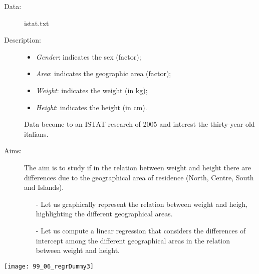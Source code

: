 \begin{frame}
  \begin{description}
    \item[Data: ]istat.txt \\ 
    \item[Description: ]
      \begin{footnotesize}
        \begin{itemize}
          \item \textit{Gender}: indicates the sex (factor);
          \item \textit{Area}: indicates the geographic area (factor);
          \item \textit{Weight}: indicates the weight (in kg);
          \item \textit{Height}: indicates the height (in cm).
        \end{itemize}
      \end{footnotesize}
      \begin{tiny}
       Data become to an ISTAT research of 2005 and interest the thirty-year-old italians.
      \end{tiny}
    \item[Aims: ]
      \begin{footnotesize}
        The aim is to study if in the relation between weight and height there are differences due to the geographical area of residence (North, Centre, South and Islands).
       \begin{itemize}
          \item[-] Let us graphically represent the relation between weight and heigh, highlighting the different geographical areas.
          \item[-] Let us compute a linear regression that considers the differences of intercept among the different geographical areas in the relation between weight and height.
        \end{itemize}
      \end{footnotesize}
  \end{description}
\end{frame}

\begin{frame}
  \vspace{-0.3cm}
  \begin{center}
    \texttt{[image: 99\_06\_regrDummy3]}
  \end{center}
\end{frame}

